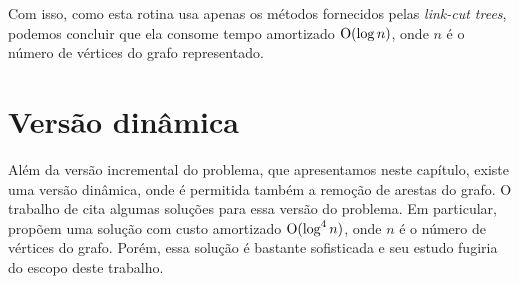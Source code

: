 Com isso, como esta rotina usa apenas os métodos fornecidos pelas \emph{link-cut trees}, podemos concluir que ela consome tempo amortizado $\mathrm{O}(\log n)$, onde $n$ é o número de vértices do grafo representado.

\section{Versão dinâmica}
\label{sec:versao-dinamica}

Além da versão incremental do problema, que apresentamos neste capítulo, existe uma versão dinâmica, onde é permitida também a remoção de arestas do grafo. O trabalho de \citet{hanauer2021recent} cita algumas soluções para essa versão do problema. Em particular, \citet{10.1145/502090.502095} propõem uma solução com custo amortizado $\mathrm{O}(\log^4 n)$, onde $n$ é o número de vértices do grafo. Porém, essa solução é bastante sofisticada e seu estudo fugiria do escopo deste trabalho.